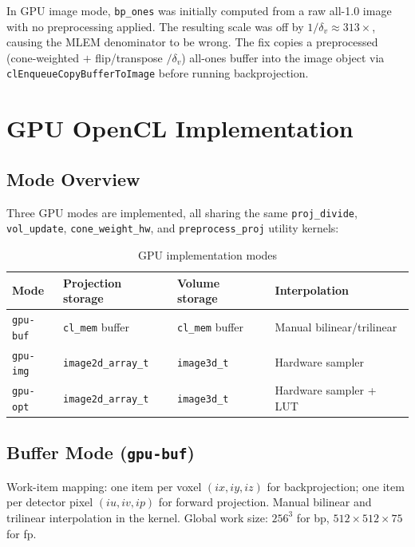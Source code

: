 \documentclass[11pt,a4paper]{article}
\begin{document}
In GPU image mode, \texttt{bp\_ones} was initially computed from a raw all-1.0
image with no preprocessing applied. The resulting scale was off by
$1/\delta_v \approx 313\times$, causing the MLEM denominator to be wrong. The fix
copies a preprocessed (cone-weighted $+$ flip/transpose $/\delta_v$) all-ones buffer
into the image object via \texttt{clEnqueueCopyBufferToImage} before running
backprojection.

\section{GPU OpenCL Implementation}
\label{sec:gpu}

\subsection{Mode Overview}

Three GPU modes are implemented, all sharing the same \texttt{proj\_divide},
\texttt{vol\_update}, \texttt{cone\_weight\_hw}, and \texttt{preprocess\_proj}
utility kernels:

\begin{table}[h]
\centering
\begin{tabular}{llll}
\toprule
Mode & Projection storage & Volume storage & Interpolation \\
\midrule
\texttt{gpu-buf} & \texttt{cl\_mem} buffer & \texttt{cl\_mem} buffer & Manual bilinear/trilinear \\
\texttt{gpu-img} & \texttt{image2d\_array\_t} & \texttt{image3d\_t} & Hardware sampler \\
\texttt{gpu-opt} & \texttt{image2d\_array\_t} & \texttt{image3d\_t} & Hardware sampler + LUT \\
\bottomrule
\end{tabular}
\caption{GPU implementation modes}
\end{table}

\subsection{Buffer Mode (\texttt{gpu-buf})}

Work-item mapping: one item per voxel $(ix, iy, iz)$ for backprojection; one item
per detector pixel $(iu, iv, ip)$ for forward projection. Manual bilinear and
trilinear interpolation in the kernel. Global work size: $256^3$ for bp,
$512 \times 512 \times 75$ for fp.
\end{document}
